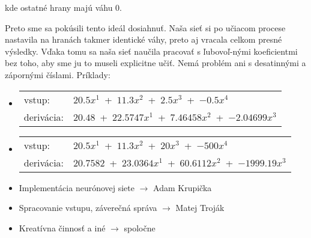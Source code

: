 \documentclass[12pt]{article}
\newcommand{\mysmallsection}[1]{\vspace{0.5cm}{\centering\large\textbf{#1}\\}\normalsize\vspace{0.5cm}}
\newcommand*\arc{{\fontfamily{pbk}\fontseries{db}\selectfont+}}
\def\layersep{2.5cm}
\begin{document}
\begin{center}
\end{center}

\noindent kde ostatné hrany majú váhu 0. 

Preto sme sa pokúsili tento ideál dosiahnuť. Naša sieť si po učiacom procese nastavila na hranách takmer identické váhy, preto aj vracala celkom presné výsledky. Vďaka tomu sa naša sieť naučila pracovať s ľubovoľ-nými koeficientmi bez toho, aby sme ju to museli explicitne učiť. Nemá problém ani s desatinnými a zápornými číslami. Príklady:

\begin{itemize}
\item \begin{tabular}{ l l }
		vstup: & $20.5x^1$~\arc~$11.3x^2$~\arc~$2.5x^3$~\arc~$-0.5x^4$\\
		derivácia: & $20.48$~\arc~$22.5747x^1$~\arc~$7.46458x^2$~\arc~$-2.04699x^3$
	  \end{tabular}
\item \begin{tabular}{ l l }
		vstup: & $20.5x^1$~\arc~$11.3x^2$~\arc~$20x^3$~\arc~$-500x^4$\\
		derivácia: & $20.7582$~\arc~$23.0364x^1$~\arc~$60.6112x^2$~\arc~$-1999.19x^3$
	  \end{tabular}
\end{itemize}

\mysmallsection{Rozdelenie práce}

\begin{itemize}
\item Implementácia neurónovej siete $\rightarrow$ Adam Krupička

\item Spracovanie vstupu, záverečná správa $\rightarrow$ Matej Troják

\item Kreatívna činnosť a iné $\rightarrow$ spoločne
\end{itemize}
\end{document}
